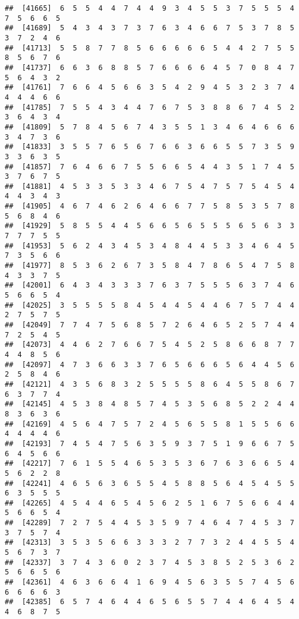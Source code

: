 \documentclass[
]{book}
\begin{document}
\begin{verbatim}
##  [41665]  6  5  5  4  4  7  4  4  9  3  4  5  5  3  7  5  5  5  4  7  5  6  6  5
##  [41689]  5  4  3  4  3  7  3  7  6  3  4  6  6  7  5  3  7  8  5  3  7  2  4  6
##  [41713]  5  5  8  7  7  8  5  6  6  6  6  6  5  4  4  2  7  5  5  8  5  6  7  6
##  [41737]  6  6  3  6  8  8  5  7  6  6  6  6  4  5  7  0  8  4  7  5  6  4  3  2
##  [41761]  7  6  6  4  5  6  6  3  5  4  2  9  4  5  3  2  3  7  4  4  4  4  6  6
##  [41785]  7  5  5  4  3  4  4  7  6  7  5  3  8  8  6  7  4  5  2  3  6  4  3  4
##  [41809]  5  7  8  4  5  6  7  4  3  5  5  1  3  4  6  4  6  6  6  3  4  7  3  6
##  [41833]  3  5  5  7  6  5  6  7  6  6  3  6  6  5  5  7  3  5  9  3  3  6  3  5
##  [41857]  7  6  4  6  6  7  5  5  6  6  5  4  4  3  5  1  7  4  5  3  7  6  7  5
##  [41881]  4  5  3  3  5  3  3  4  6  7  5  4  7  5  7  5  4  5  4  4  4  3  4  3
##  [41905]  4  6  7  4  6  2  6  4  6  6  7  7  5  8  5  3  5  7  8  5  6  8  4  6
##  [41929]  5  8  5  5  4  4  5  6  6  5  6  5  5  5  6  5  6  3  3  7  7  7  5  5
##  [41953]  5  6  2  4  3  4  5  3  4  8  4  4  5  3  3  4  6  4  5  7  3  5  6  6
##  [41977]  8  5  3  6  2  6  7  3  5  8  4  7  8  6  5  4  7  5  8  4  3  3  7  5
##  [42001]  6  4  3  4  3  3  3  7  6  3  7  5  5  5  6  3  7  4  6  5  6  6  5  4
##  [42025]  3  5  5  5  5  8  4  5  4  4  5  4  4  6  7  5  7  4  4  2  7  5  7  5
##  [42049]  7  7  4  7  5  6  8  5  7  2  6  4  6  5  2  5  7  4  4  7  2  5  4  5
##  [42073]  4  4  6  2  7  6  6  7  5  4  5  2  5  8  6  6  8  7  7  4  4  8  5  6
##  [42097]  4  7  3  6  6  3  3  7  6  5  6  6  6  5  6  4  4  5  6  2  5  8  4  6
##  [42121]  4  3  5  6  8  3  2  5  5  5  5  8  6  4  5  5  8  6  7  6  3  7  7  4
##  [42145]  4  5  3  8  4  8  5  7  4  5  3  5  6  8  5  2  2  4  4  8  3  6  3  6
##  [42169]  4  5  6  4  7  5  7  2  4  5  6  5  5  8  1  5  5  6  6  4  4  4  4  6
##  [42193]  7  4  5  4  7  5  6  3  5  9  3  7  5  1  9  6  6  7  5  6  4  5  6  6
##  [42217]  7  6  1  5  5  4  6  5  3  5  3  6  7  6  3  6  6  5  4  5  6  2  2  8
##  [42241]  4  6  5  6  3  6  5  5  4  5  8  8  5  6  4  5  4  5  5  6  3  5  5  5
##  [42265]  4  5  4  4  6  5  4  5  6  2  5  1  6  7  5  6  6  4  4  5  6  6  5  4
##  [42289]  7  2  7  5  4  4  5  3  5  9  7  4  6  4  7  4  5  3  7  3  7  5  7  4
##  [42313]  3  5  3  5  6  6  3  3  3  2  7  7  3  2  4  4  5  5  4  5  6  7  3  7
##  [42337]  3  7  4  3  6  0  2  3  7  4  5  3  8  5  2  5  3  6  2  5  6  6  5  6
##  [42361]  4  6  3  6  6  4  1  6  9  4  5  6  3  5  5  7  4  5  6  6  6  6  6  3
##  [42385]  6  5  7  4  6  4  4  6  5  6  5  5  7  4  4  6  4  5  4  4  6  8  7  5

\end{verbatim}
\end{document}
